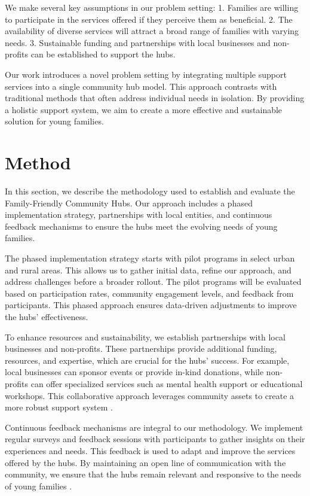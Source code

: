 \documentclass{article} %
\begin{document}
We make several key assumptions in our problem setting:
1. Families are willing to participate in the services offered if they perceive them as beneficial.
2. The availability of diverse services will attract a broad range of families with varying needs.
3. Sustainable funding and partnerships with local businesses and non-profits can be established to support the hubs.

Our work introduces a novel problem setting by integrating multiple support services into a single community hub model. This approach contrasts with traditional methods that often address individual needs in isolation. By providing a holistic support system, we aim to create a more effective and sustainable solution for young families.

\section{Method}
\label{sec:method}
In this section, we describe the methodology used to establish and evaluate the Family-Friendly Community Hubs. Our approach includes a phased implementation strategy, partnerships with local entities, and continuous feedback mechanisms to ensure the hubs meet the evolving needs of young families.

The phased implementation strategy starts with pilot programs in select urban and rural areas. This allows us to gather initial data, refine our approach, and address challenges before a broader rollout. The pilot programs will be evaluated based on participation rates, community engagement levels, and feedback from participants. This phased approach ensures data-driven adjustments to improve the hubs' effectiveness.

To enhance resources and sustainability, we establish partnerships with local businesses and non-profits. These partnerships provide additional funding, resources, and expertise, which are crucial for the hubs' success. For example, local businesses can sponsor events or provide in-kind donations, while non-profits can offer specialized services such as mental health support or educational workshops. This collaborative approach leverages community assets to create a more robust support system \citep{zhou2023peer}.

Continuous feedback mechanisms are integral to our methodology. We implement regular surveys and feedback sessions with participants to gather insights on their experiences and needs. This feedback is used to adapt and improve the services offered by the hubs. By maintaining an open line of communication with the community, we ensure that the hubs remain relevant and responsive to the needs of young families \citep{west2023agent}.
\end{document}
